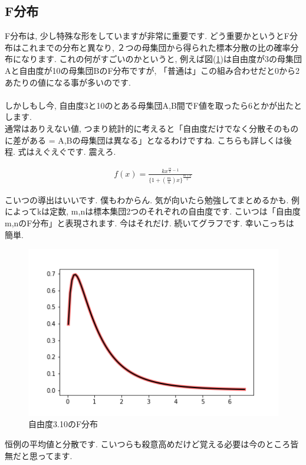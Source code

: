 \documentclass[11pt,a4paper,uplatex]{ujreport} 	%
\begin{document}
\subsection{F分布}
F分布は, 少し特殊な形をしていますが非常に重要です. どう重要かというとF分布はこれまでの分布と異なり, ２つの母集団から得られた標本分散の比の確率分布になります. これの何がすごいのかというと, 例えば図(\ref{im:f_dist})は自由度が3の母集団Aと自由度が10の母集団BのF分布ですが, 「普通は」この組み合わせだと0から2あたりの値になる事が多いのです. \\
\\
しかしもし今, 自由度3と10のとある母集団A,B間でF値を取ったら6とかが出たとします. \\
通常はありえない値, つまり統計的に考えると「自由度だけでなく分散そのものに差がある = A,Bの母集団は異なる」となるわけですね. こちらも詳しくは後程. 式はえぐえぐです. 震えろ.

\begin{eqnarray}
f(x) = \frac{kx^{\frac{m}{2}-1}}{\{1 + (\frac{m}{n})x\}^{\frac{m+n}{2}}}
\end{eqnarray}

こいつの導出はいいです. 僕もわからん. 気が向いたら勉強してまとめるかも. 例によってkは定数, m,nは標本集団2つのそれぞれの自由度です. こいつは「自由度m,nのF分布」と表現されます. 今はそれだけ. 続いてグラフです. 幸いこっちは簡単.

\begin{figure}[H]
\label{im:f_dist}
  \centering
  \includegraphics[width=120mm,bb=0 0 432 288]{figures/f_dist.png}
  \caption{自由度3.10のF分布}
\end{figure}

恒例の平均値と分散です. こいつらも殺意高めだけど覚える必要は今のところ皆無だと思ってます.
\end{document}
